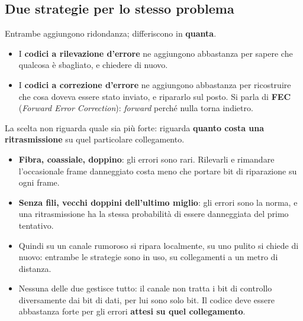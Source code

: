 
\subsection{Due strategie per lo stesso problema}

Entrambe aggiungono ridondanza; differiscono in \textbf{quanta}.

\begin{itemize}
    \item I \textbf{codici a rilevazione d'errore} ne aggiungono abbastanza per sapere che qualcosa è sbagliato, e chiedere di nuovo.
    \item I \textbf{codici a correzione d'errore} ne aggiungono abbastanza per ricostruire che cosa doveva essere stato inviato, e
          ripararlo sul posto. Si parla di \textbf{FEC} (\emph{Forward Error Correction}): \emph{forward} perché nulla torna
          indietro.
\end{itemize}

La scelta non riguarda quale sia più forte: riguarda \textbf{quanto costa una ritrasmissione} su quel particolare collegamento.

\begin{itemize}
    \item \textbf{Fibra, coassiale, doppino}: gli errori sono rari. Rilevarli e rimandare l'occasionale frame danneggiato costa meno
          che portare bit di riparazione su ogni frame.
    \item \textbf{Senza fili, vecchi doppini dell'ultimo miglio}: gli errori sono la norma, e una ritrasmissione ha la stessa
          probabilità di essere danneggiata del primo tentativo.
    \item Quindi su un canale rumoroso si ripara localmente, su uno pulito si chiede di nuovo: entrambe le strategie sono in uso, su
          collegamenti a un metro di distanza.
    \item Nessuna delle due gestisce tutto: il canale non tratta i bit di controllo diversamente dai bit di dati, per lui sono solo
          bit. Il codice deve essere abbastanza forte per gli errori \textbf{attesi su quel collegamento}.
\end{itemize}

